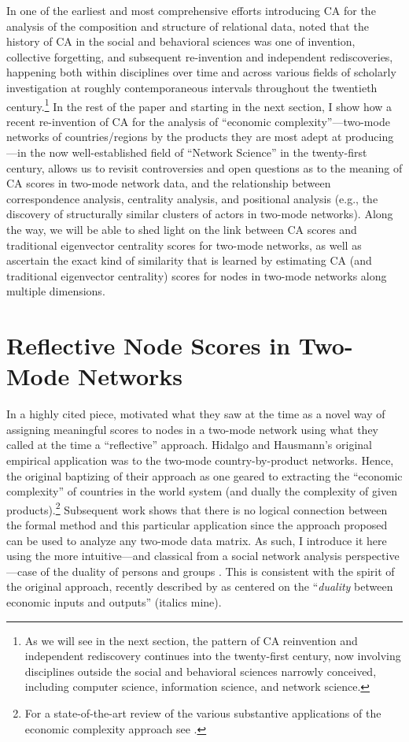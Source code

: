 \documentclass[a4paper,fleqn]{cas-sc}
\begin{document}
In one of the earliest and most comprehensive efforts introducing CA for the analysis of the composition and structure of relational data, \citet[19-21]{wasserman1990correspondence} noted that the history of CA in the social and behavioral sciences was one of invention, collective forgetting, and subsequent re-invention and independent rediscoveries, happening both within disciplines over time and across various fields of scholarly investigation at roughly contemporaneous intervals throughout the twentieth century.\footnote{As we will see in the next section, the pattern of CA reinvention and independent rediscovery continues into the twenty-first century, now involving disciplines outside the social and behavioral sciences narrowly conceived, including computer science, information science, and network science.} In the rest of the paper and starting in the next section, I show how a recent re-invention of CA for the analysis of ``economic complexity''---two-mode networks of countries/regions by the products they are most adept at producing---in the now well-established field of ``Network Science'' in the twenty-first century, allows us to revisit controversies and open questions as to the meaning of CA scores in two-mode network data, and the relationship between correspondence analysis, centrality analysis, and positional analysis (e.g., the discovery of structurally similar clusters of actors in two-mode networks). Along the way, we will be able to shed light on the link between CA scores and traditional eigenvector centrality scores for two-mode networks, as well as ascertain the exact kind of similarity that is learned by estimating CA (and traditional eigenvector centrality) scores for nodes in two-mode networks along multiple dimensions. 

\section{Reflective Node Scores in Two-Mode Networks} \label{sec:ref2mode}
In a highly cited piece, \citet{hidalgo2009building} motivated what they saw at the time as a novel way of assigning meaningful scores to nodes in a two-mode network using what they called at the time a ``reflective'' approach. Hidalgo and Hausmann's original empirical application was to the two-mode country-by-product networks. Hence, the original baptizing of their approach as one geared to extracting the ``economic complexity'' of countries in the world system (and dually the complexity of given products).\footnote{For a state-of-the-art review of the various substantive applications of the economic complexity approach see \citet{hidalgo2021economic}.} Subsequent work shows that there is no logical connection between the formal method and this particular application since the approach proposed can be used to analyze any two-mode data matrix. As such, I introduce it here using the more intuitive---and classical from a social network analysis perspective---case of the duality of persons and groups \citep{breiger1974duality}. This is consistent with the spirit of the original approach, recently described by \citet[92]{hidalgo2021economic} as centered on the ``\textit{duality} between economic inputs and outputs'' (italics mine).
\end{document}
